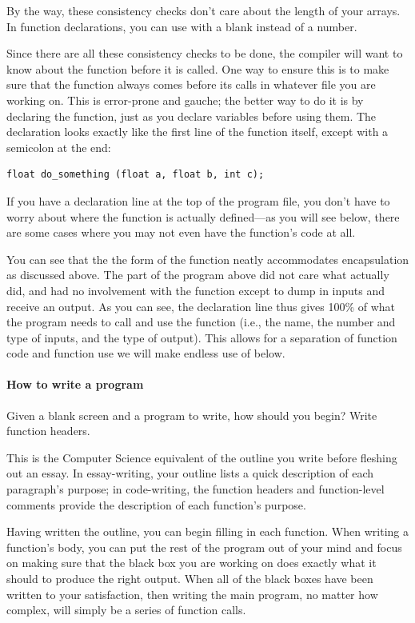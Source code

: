 By the way, these consistency checks don't care about the length of
your arrays. In function declarations, you can use 
with a blank instead of a number.  

Since there are all these consistency
checks to be done, the compiler will want to know about the function
before it is called. One way to ensure this is to make sure that
the function always comes before its calls in whatever file you are
working on. This is error-prone and gauche; the better way to do it is
by declaring the function, just as you declare variables before using
them. The declaration looks exactly like the first line of the function
itself, except with a semicolon at the end:

\begin{lstlisting}
float do_something (float a, float b, int c);
\end{lstlisting}

If you have a declaration line at the top of the program file, you don't
have to worry about where the function is actually defined---as
you will see below, there are some cases where you may not even have the
function's code at all. 

You can see that the the form of the function neatly accommodates
encapsulation as discussed above.  
The  part of the program above did not care what
 actually did, and had no involvement with the
function except to dump in inputs and receive an output. As you can see,
the declaration line thus gives 100\% of what the program needs to call
and use the function (i.e., the name, the number and type of inputs,
and the type of output). This allows for a separation of function code
and function use we will make endless use of below.

\paragraph{How to write a program}
Given a blank screen and a program to write, how should you begin?
Write function headers.

This is the Computer Science equivalent of the outline you write before
fleshing out an essay. In essay-writing, your outline lists a quick
description of each paragraph's purpose; in code-writing, the function
headers and function-level comments provide the description of each
function's purpose.

Having written the outline, you can begin filling in each function.
When writing a function's body, you can put the rest of the program out of
your mind and focus on making sure that the black box you are working on
does exactly what it should to produce the right output. When all of the
black boxes have been written to your satisfaction, then writing the main
program, no matter how complex, will simply be a series of function calls.

